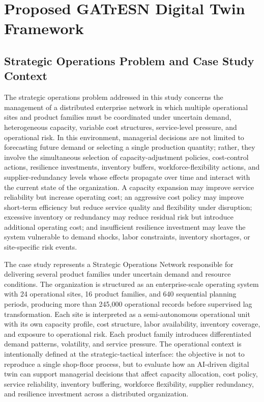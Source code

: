 \documentclass[apajournal,article,submit,pdftex,moreauthors]{Definitions/mdpi}
\begin{document}
\section{Proposed GATrESN Digital Twin Framework}
\subsection{Strategic Operations Problem and Case Study Context}
The strategic operations problem addressed in this study concerns the management of a distributed enterprise network in which multiple operational sites and product families must be coordinated under uncertain demand, heterogeneous capacity, variable cost structures, service-level pressure, and operational risk. In this environment, managerial decisions are not limited to forecasting future demand or selecting a single production quantity; rather, they involve the simultaneous selection of capacity-adjustment policies, cost-control actions, resilience investments, inventory buffers, workforce-flexibility actions, and supplier-redundancy levels whose effects propagate over time and interact with the current state of the organization. A capacity expansion may improve service reliability but increase operating cost; an aggressive cost policy may improve short-term efficiency but reduce service quality and flexibility under disruption; excessive inventory or redundancy may reduce residual risk but introduce additional operating cost; and insufficient resilience investment may leave the system vulnerable to demand shocks, labor constraints, inventory shortages, or site-specific risk events.

The case study represents a Strategic Operations Network responsible for delivering several product families under uncertain demand and resource conditions. The organization is structured as an enterprise-scale operating system with 24 operational sites, 16 product families, and 640 sequential planning periods, producing more than 245,000 operational records before supervised lag transformation. Each site is interpreted as a semi-autonomous operational unit with its own capacity profile, cost structure, labor availability, inventory coverage, and exposure to operational risk. Each product family introduces differentiated demand patterns, volatility, and service pressure. The operational context is intentionally defined at the strategic-tactical interface: the objective is not to reproduce a single shop-floor process, but to evaluate how an AI-driven digital twin can support managerial decisions that affect capacity allocation, cost policy, service reliability, inventory buffering, workforce flexibility, supplier redundancy, and resilience investment across a distributed organization.
\end{document}
